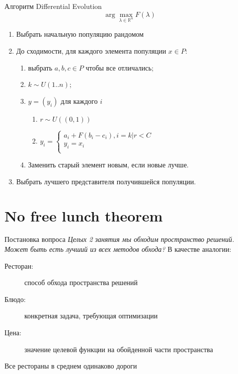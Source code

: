 \documentclass[14pt, fleqn, xcolor={dvipsnames, table}]{beamer}
\begin{document}
\begin{frame}{Алгоритм Differential Evolution}
$$
\arg\max_{\lambda \in \mathbb{R}^n} F(\lambda)
$$


\begin{enumerate}
  \item Выбрать начальную популяцию рандомом
  \item До сходимости, для каждого элемента популяции $x \in P$:
  \begin{enumerate}
    \item выбрать $a, b, c \in P$ чтобы все отличались;
    \item $k \sim U(1..n)$;
    \item $y = (y_i)$ для каждого $i$
    \begin{enumerate}
      \item $r \sim U((0,1))$
      \item $y_i = \left\{ \begin{array}{ll} a_i + F(b_i - c_i), i =k | r < C \\ y_i = x_i \\ \end{array} \right. $
    \end{enumerate}
    \item Заменить старый элемент новым, если новые лучше.
  \end{enumerate}
  \item Выбрать лучшего представителя получившейся популяции.
\end{enumerate}
\end{frame}

\section{No free lunch theorem}
\begin{frame}{Постановка вопроса}
\textit{Целых 2 занятия мы обходим пространство решений. Может быть есть лучший из всех методов обхода?}
В качестве аналогии:
\begin{description}
  \item[Ресторан:] способ обхода пространства решений
  \item[Блюдо:] конкретная задача, требующая оптимизации
  \item[Цена:] значение целевой функции на обойденной части пространства
\end{description}
\begin{theorem}
Все рестораны в среднем одинаково дороги
\end{theorem}
\end{frame}
\end{document}
